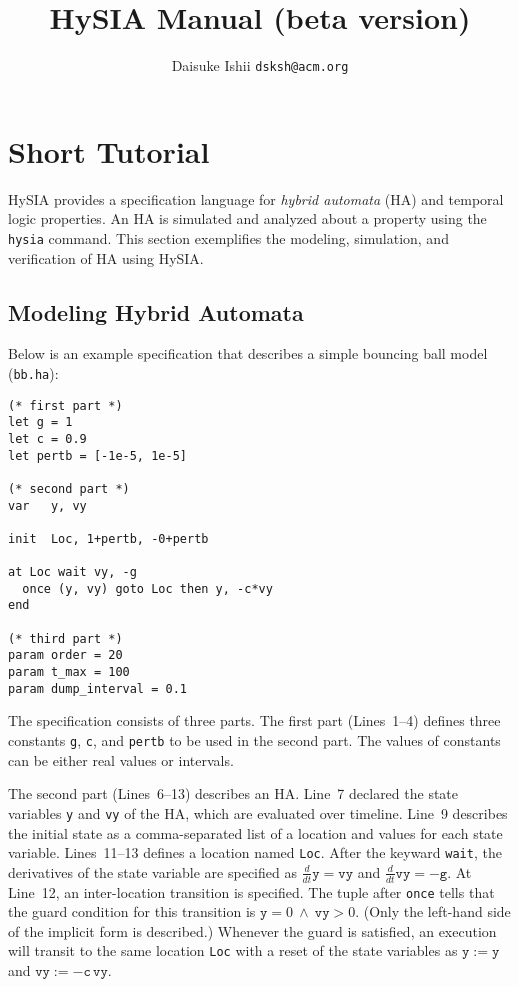 \documentclass[10pt,a4paper]{article}
\begin{document}
\title{HySIA Manual (beta version)}
\author{Daisuke Ishii \quad \texttt{dsksh@acm.org}}

\maketitle

\setlength{\grammarparsep}{8pt plus 1pt minus 1pt} %
\setlength{\grammarindent}{8em} %

\section{Short Tutorial}

HySIA provides a specification language for \emph{hybrid automata} (HA) and temporal logic properties.
An HA is simulated and analyzed about a property using the \verb|hysia| command.
This section exemplifies the modeling, simulation, and verification of HA using HySIA.

\subsection{Modeling Hybrid Automata}

Below is an example specification that describes a simple bouncing ball model (\texttt{bb.ha}):
\begin{lstlisting}
(* first part *)
let g = 1
let c = 0.9
let pertb = [-1e-5, 1e-5]

(* second part *)
var   y, vy

init  Loc, 1+pertb, -0+pertb

at Loc wait vy, -g
  once (y, vy) goto Loc then y, -c*vy
end

(* third part *)
param order = 20
param t_max = 100
param dump_interval = 0.1
\end{lstlisting}
%
The specification consists of three parts.
The first part (Lines~1--4) defines three constants \verb|g|, \verb|c|, and \verb|pertb| to be used in the second part.
The values of constants can be either real values or intervals.

The second part (Lines~6--13) describes an HA.
Line~7 declared the state variables \verb|y| and \verb|vy| of the HA, which are evaluated over timeline.
Line~9 describes the initial state as a comma-separated list of a location and values for each state variable.
Lines~11--13 defines a location named \verb|Loc|.
After the keyward \verb|wait|, the derivatives of the state variable are specified as $\frac{d}{dt}\mathtt{y} = \mathtt{vy}$ and $\frac{d}{dt}\mathtt{vy} = -\mathtt{g}$.
At Line~12, an inter-location transition is specified.
The tuple after \verb|once| tells that the guard condition for this transition is $\mathtt{y} = 0 ~\land~ \mathtt{vy} > 0$. (Only the left-hand side of the implicit form is described.)
Whenever the guard is satisfied, an execution will transit to the same location \verb|Loc| with a reset of the state variables as $\mathtt{y} := \mathtt{y}$ and $\mathtt{vy} := -\mathtt{c}\,\mathtt{vy}$.
\end{document}
